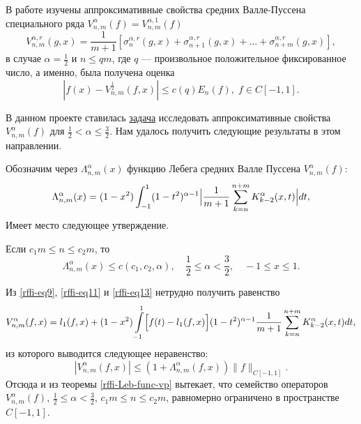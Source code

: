 В работе \cite{rffi-15} изучены аппроксимативные свойства средних Валле-Пуссена специального ряда $V_{n,m}^\alpha(f)=V_{n,m}^{\alpha,1}(f)$
\begin{equation}\label{rffi-vp-r}
	V_{n,m}^{\alpha, r}(g, x) = \frac{1}{m+1} \left[ \sigma_n^{\alpha, r}(g, x) + \sigma_{n+1}^{\alpha, r}(g, x) + \ldots + \sigma_{n+m}^{\alpha, r}(g, x) \right],
\end{equation}
в случае $\alpha=\frac{1}{2}$ и $n \le qm$, где $q$ --- произвольное положительное фиксированное число, а именно, была получена оценка
\begin{equation}\label{rffi-est-Vp05}
|f(x)-V_{n,m}^\frac{1}{2}(f,x)| \le c(q) E_n(f), \; f \in C[-1,1].
\end{equation}

В данном проекте ставилась \hyperlink{task2}{задача} исследовать аппроксимативные свойства $V_{n,m}^\alpha(f)$ для $\frac{1}{2} < \alpha \le \frac{3}{2}$. Нам удалось получить следующие результаты в этом направлении.

Обозначим через $\Lambda_{n,m}^\alpha(x)$ функцию Лебега средних Валле Пуссена $V_{n,m}^\alpha(f)$:
\begin{equation*}
\Lambda_{n,m}^\alpha(x)=
(1-x^2)\int_{-1}^{1}(1-t^2)^{\alpha-1}\Bigl|
\frac{1}{m+1}\sum\limits_{k=n}^{n+m}K^\alpha_{k-2}(x,t)
\Bigr|dt,
\end{equation*}
Имеет место следующее утверждение.
\begin{theorem}\label{rffi-Leb-func-vp}
Если $c_1 m \le n \le c_2 m$, то
\begin{equation}
  \Lambda_{n,m}^\alpha(x)\le c(c_1, c_2, \alpha), \quad \frac12 \le \alpha < \frac32, \quad -1 \le x \le 1.
\end{equation}
\end{theorem}

Из \eqref{rffi-eq9}, \eqref{rffi-eq11} и \eqref{rffi-eq13} нетрудно получить равенство
\begin{equation*}
V_{n,m}^\alpha(f,x)=
l_1(f,x)+(1-x^2)\int\limits_{-1}^{1}
\Bigl[
f(t)-l_1(f,x)
\Bigr]
(1-t^2)^{\alpha-1}\frac{1}{m+1}\sum\limits_{k=n}^{n+m}K_{k-2}^\alpha(x,t)dt,
\end{equation*}
из которого выводится следующее неравенство:
\begin{equation*}
|V_{n,m}^\alpha(f,x)| \le (1+\Lambda_{n,m}^\alpha(f,x))\|f\|_{C[-1,1]}.
\end{equation*}
Отсюда и из теоремы \ref{rffi-Leb-func-vp} вытекает, что семейство операторов $V_{n,m}^\alpha(f)$, $\frac12\le \alpha < \frac32$, $c_1m \le n\le c_2m$, равномерно ограничено в пространстве $C[-1,1]$.

